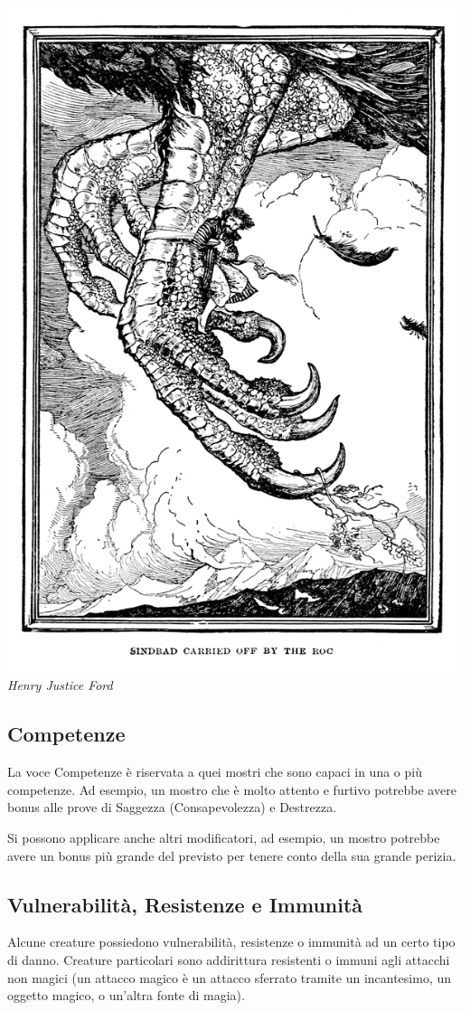 \begin{multicols}{2}
	\begin{center}
		\includegraphics[width=0.65\linewidth]{immagini/roc.png}\\
		\textit{Henry Justice Ford}
	\end{center}

	\subsection{Competenze}

	La voce Competenze è riservata a quei mostri che sono capaci in una o più competenze. Ad esempio, un mostro che è molto attento e furtivo potrebbe avere bonus alle prove di Saggezza (Consapevolezza) e Destrezza.

	Si possono applicare anche altri modificatori, ad esempio, un mostro potrebbe avere un bonus più grande del previsto per tenere conto della sua grande perizia.

	\subsection{Vulnerabilità, Resistenze e Immunità}
	Alcune creature possiedono vulnerabilità, resistenze o immunità ad un certo tipo di danno. Creature particolari sono addirittura resistenti o immuni agli attacchi non magici (un attacco magico è un attacco sferrato tramite un incantesimo, un oggetto magico, o un'altra fonte di magia).


\end{multicols}
